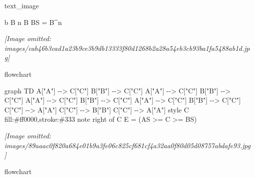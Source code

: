 \documentclass[
]{article}
\newenvironment{Shaded}{}{}
\newcommand{\NormalTok}[1]{#1}
\begin{document}
text\_image

b B n B BS = B\^{}n

\textit{[Image omitted: images/cab46b3cad1a23b9ce3b9db13333f80d1268b2a28a54eb3cb93ba1fa5488ab1d.jpg]}

flowchart

\begin{Shaded}
\begin{Highlighting}[]
\NormalTok{graph TD}
\NormalTok{    A["A"] {-}{-}\textgreater{} C["C"]}
\NormalTok{    B["B"] {-}{-}\textgreater{} C["C"]}
\NormalTok{    A["A"] {-}{-}\textgreater{} C["C"]}
\NormalTok{    B["B"] {-}{-}\textgreater{} C["C"]}
\NormalTok{    A["A"] {-}{-}\textgreater{} C["C"]}
\NormalTok{    B["B"] {-}{-}\textgreater{} C["C"]}
\NormalTok{    A["A"] {-}{-}\textgreater{} C["C"]}
\NormalTok{    B["B"] {-}{-}\textgreater{} C["C"]}
\NormalTok{    C["C"] {-}{-}\textgreater{} A["A"]}
\NormalTok{    C["C"] {-}{-}\textgreater{} B["B"]}
\NormalTok{    C["C"] {-}{-}\textgreater{} A["A"]}
\NormalTok{    style C fill:\#ff0000,stroke:\#333}
\NormalTok{    note right of C E = (AS \textgreater{}= C \textgreater{}= BS)}
\end{Highlighting}
\end{Shaded}

\textit{[Image omitted: images/89aaac0f820a684e01b9a3fe06c825cf681cf4a32aa0f80d05d08757abdafe93.jpg]}

flowchart
\end{document}
